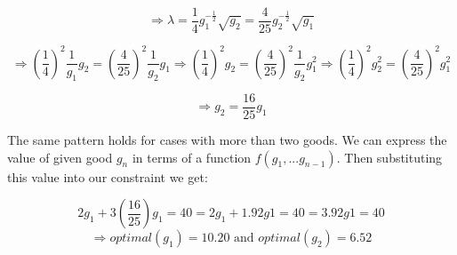 \documentclass{tufte-handout}
\begin{document}
$$ \Rightarrow \lambda = \frac{1}{4}g_{1}^{-\frac{1}{2}}\sqrt{g_{2}} = \frac{4}{25}g_{2}^{-\frac{1}{2}}\sqrt{g_{1}}$$

$$ \Rightarrow  (\frac{1}{4})^2\frac{1}{g_{1}}g_{2} = (\frac{4}{25})^2\frac{1}{g_{2}}g_{1} \Rightarrow (\frac{1}{4})^2 g_{2} = (\frac{4}{25})^2\frac{1}{g_{2}}g_{1}^2  \Rightarrow (\frac{1}{4})^2g_{2}^{2} = (\frac{4}{25})^2g_{1}^2 $$ 

$$ \Rightarrow g_{2} = \frac{16}{25}g_{1}$$

The same pattern holds for cases with more than two goods. We can express the value of given good $g_n$ in terms of a function $f(g_{1}, ... g_{n-1}) $. Then substituting this value into our constraint we get: 

$$ 2g_{1} + 3(\frac{16}{25})g_{1} = 40 = 2g_{1} + 1.92g1 = 40 = 3.92g1 = 40$$
$$ \Rightarrow optimal(g_{1}) = 10.20 \text{ and } optimal(g_{2}) = 6.52 $$





\end{document}
